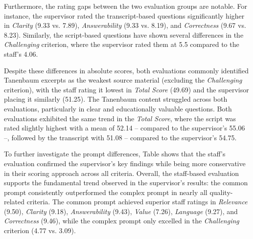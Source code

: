 Furthermore, the rating gaps between the two evaluation groups are notable. For instance, the supervisor rated the transcript-based questions significantly higher in \textit{Clarity} (9.33 vs. 7.89), \textit{Answerability} (9.33 vs. 8.19), and \textit{Correctness} (9.67 vs. 8.23). Similarly, the script-based questions have shown several differences in the \textit{Challenging} criterion, where the supervisor rated them at 5.5 compared to the staff's 4.06.

Despite these differences in absolute scores, both evaluations commonly identified Tanenbaum excerpts as the weakest source material (excluding the \textit{Challenging} criterion), with the staff rating it lowest in \textit{Total Score} (49.69) and the supervisor placing it similarly (51.25). The Tanenbaum content struggled across both evaluations, particularly in clear and educationally valuable questions. Both evaluations exhibited the same trend in the \textit{Total Score}, where the script was rated slightly highest with a mean of 52.14 -- compared to the supervisor's 55.06 --, followed by the transcript with 51.08 -- compared to the supervisor's 54.75.

To further investigate the prompt differences, Table  shows that the staff's evaluation confirmed the supervisor's key findings while being more conservative in their scoring approach across all criteria. Overall, the staff-based evaluation supports the fundamental trend observed in the supervisor's results: the common prompt consistently outperformed the complex prompt in nearly all quality-related criteria. The common prompt achieved superior staff ratings in \textit{Relevance} (9.50), \textit{Clarity} (9.18), \textit{Answerability} (9.43), \textit{Value} (7.26), \textit{Language} (9.27), and \textit{Correctness} (9.46), while the complex prompt only excelled in the \textit{Challenging} criterion (4.77 vs. 3.09).


